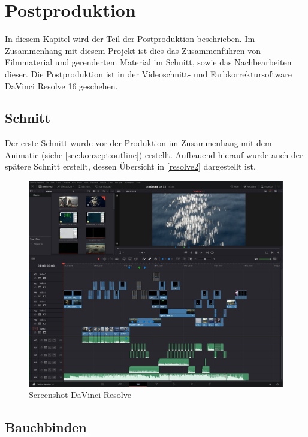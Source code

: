 \chapter{Postproduktion}

In diesem Kapitel wird der Teil der Postproduktion beschrieben. Im Zusammenhang mit diesem Projekt ist dies das Zusammenführen von Filmmaterial und gerendertem Material im Schnitt, sowie das Nachbearbeiten dieser. Die Postproduktion ist in der Videoschnitt- und Farbkorrektursoftware DaVinci Resolve 16 geschehen.

\section{Schnitt}

Der erste Schnitt wurde vor der Produktion im Zusammenhang mit dem Animatic (siehe \autoref{sec:konzept:outline}) erstellt. Aufbauend hierauf wurde auch der spätere Schnitt erstellt, dessen Übersicht in \autoref{resolve2} dargestellt ist.

\begin{figure}[H]
\begin{center}
\includegraphics[width=\textwidth]{gfx/post/resolve2.jpg}
\caption{Screenshot DaVinci Resolve}
\label{resolve2}
\end{center}
\end{figure}
\noindent
\section{Bauchbinden}
\label{sec:bauchbinden}

